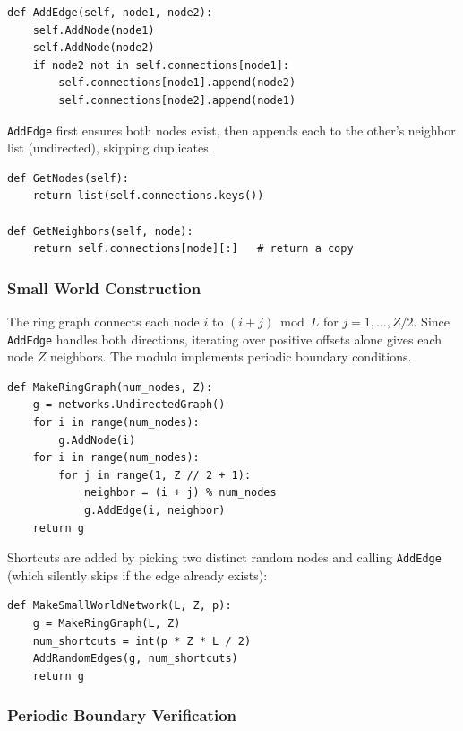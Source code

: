 \documentclass[11pt,a4paper]{article}
\begin{document}
\begin{lstlisting}[caption={AddEdge}]
def AddEdge(self, node1, node2):
    self.AddNode(node1)
    self.AddNode(node2)
    if node2 not in self.connections[node1]:
        self.connections[node1].append(node2)
        self.connections[node2].append(node1)
\end{lstlisting}

\texttt{AddEdge} first ensures both nodes exist, then appends each to the other's neighbor list (undirected), skipping duplicates.

\begin{lstlisting}[caption={GetNodes and GetNeighbors}]
def GetNodes(self):
    return list(self.connections.keys())

def GetNeighbors(self, node):
    return self.connections[node][:]   # return a copy
\end{lstlisting}

\subsubsection*{Small World Construction}

The ring graph connects each node $i$ to $(i+j) \bmod L$ for $j = 1, \ldots, Z/2$. Since \texttt{AddEdge} handles both directions, iterating over positive offsets alone gives each node $Z$ neighbors. The modulo implements periodic boundary conditions.

\begin{lstlisting}[caption={MakeRingGraph}]
def MakeRingGraph(num_nodes, Z):
    g = networks.UndirectedGraph()
    for i in range(num_nodes):
        g.AddNode(i)
    for i in range(num_nodes):
        for j in range(1, Z // 2 + 1):
            neighbor = (i + j) % num_nodes
            g.AddEdge(i, neighbor)
    return g
\end{lstlisting}

Shortcuts are added by picking two distinct random nodes and calling \texttt{AddEdge} (which silently skips if the edge already exists):

\begin{lstlisting}[caption={MakeSmallWorldNetwork}]
def MakeSmallWorldNetwork(L, Z, p):
    g = MakeRingGraph(L, Z)
    num_shortcuts = int(p * Z * L / 2)
    AddRandomEdges(g, num_shortcuts)
    return g
\end{lstlisting}

\subsubsection*{Periodic Boundary Verification}
\end{document}
